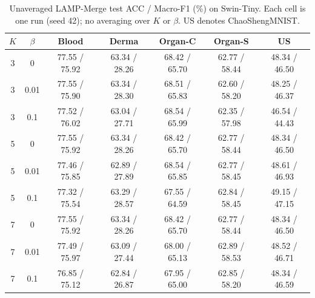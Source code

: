 \begin{table}[!t]
\centering
\small
\caption{Unaveraged LAMP-Merge test ACC / Macro-F1 (\%) on Swin-Tiny. Each cell is one run (seed 42); no averaging over $K$ or $\beta$. US denotes ChaoShengMNIST.}
\label{tab:swin-full-grid}
\setlength{\tabcolsep}{7pt}
\begin{tabular}{cc|ccccc}
\hline
$K$ & $\beta$ & Blood & Derma & Organ-C & Organ-S & US \\
\hline
3 & 0 & 77.55 / 75.92 & 63.34 / 28.26 & 68.42 / 65.70 & 62.77 / 58.44 & 48.34 / 46.50 \\
3 & 0.01 & 77.55 / 75.90 & 63.34 / 28.30 & 68.51 / 65.83 & 62.60 / 58.20 & 48.25 / 46.37 \\
3 & 0.1 & 77.52 / 76.02 & 63.04 / 27.71 & 68.54 / 65.99 & 62.35 / 57.98 & 46.54 / 44.43 \\
\hline
5 & 0 & 77.55 / 75.92 & 63.34 / 28.26 & 68.42 / 65.70 & 62.77 / 58.44 & 48.34 / 46.50 \\
5 & 0.01 & 77.46 / 75.85 & 62.89 / 27.89 & 68.54 / 65.85 & 62.77 / 58.45 & 48.61 / 46.93 \\
5 & 0.1 & 77.32 / 75.54 & 63.29 / 28.57 & 67.55 / 64.59 & 62.84 / 58.45 & 49.15 / 47.15 \\
\hline
7 & 0 & 77.55 / 75.92 & 63.34 / 28.26 & 68.42 / 65.70 & 62.77 / 58.44 & 48.34 / 46.50 \\
7 & 0.01 & 77.49 / 75.97 & 63.09 / 27.44 & 68.00 / 65.13 & 62.89 / 58.53 & 48.52 / 46.71 \\
7 & 0.1 & 76.85 / 75.12 & 62.84 / 26.87 & 67.95 / 65.00 & 62.85 / 58.20 & 48.34 / 46.59 \\
\hline
\end{tabular}
\end{table}
